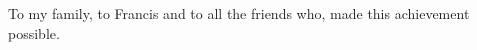 
%

\begin{ntdedication}

To my family, to Francis and to all the friends who, made this achievement possible.

\end{ntdedication}